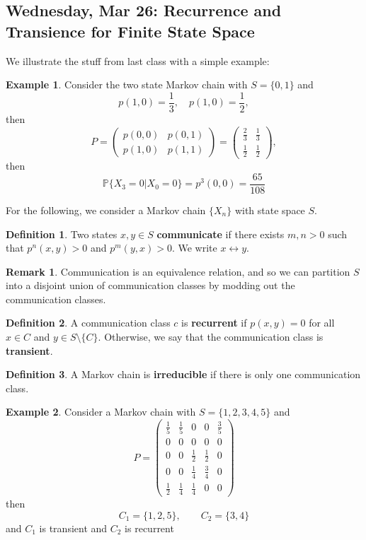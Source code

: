 \documentclass[10pt, oneside]{article}
\newcommand{\bbP}{\mathbb{P}}
\theoremstyle{definition}
\newtheorem{exmp}{Example}[section]
\newtheorem{defn}{Definition}
\newtheorem{rem}{Remark}
\begin{document}
\newpage
\subsection{Wednesday, Mar 26: Recurrence and Transience for Finite State Space}
We illustrate the stuff from last class with a simple example:
\begin{exmp}
    Consider the two state Markov chain with $S = \{0,1\}$ and 
    \[p(1,0) = \frac{1}{3}, \quad p(1,0) = \frac{1}{2},\] then 
    \[P = \begin{pmatrix}
        p(0,0) & p(0,1)\\
        p(1,0) & p(1,1) 
    \end{pmatrix} = \begin{pmatrix}
        \frac{2}{3} & \frac{1}{3}\\
        \frac{1}{2} & \frac{1}{2}
    \end{pmatrix},\] then 
    \[\bbP\{X_3 = 0 | X_0 = 0\} = p^3(0,0) = \frac{65}{108}\]
\end{exmp}
For the following, we consider a Markov chain $\{X_n\}$ with state space $S.$
\begin{defn}
    Two states $x,y \in S$ \textbf{communicate} if there exists $m,n >0$ such that $p^n(x,y) >0$ and $p^m(y,x) > 0 .$ We write $x \leftrightarrow y.$
\end{defn}
\begin{rem}
    Communication is an equivalence relation, and so we can partition $S$ into a disjoint union of communication classes by modding out the communication classes.
\end{rem}
\begin{defn}
    A communication class $c$ is \textbf{recurrent} if $p(x,y) = 0$ for all $x\in C$ and $y \in S\setminus\{C\}.$ Otherwise, we say that the communication class is \textbf{transient}.
\end{defn}

\begin{defn}
    A Markov chain is \textbf{irreducible} if there is only one communication class.
\end{defn}

\begin{exmp}
    Consider a Markov chain with $S  = \{1,2,3,4,5\}$ and 
    \[P = \begin{pmatrix}
        \frac{1}{5} & \frac{1}{5} & 0 & 0 & \frac{3}{5}\\
        0 & 0 & 0 & 0 & 0 \\
        0 & 0 & \frac{1}{2} & \frac{1}{2} & 0\\
        0 & 0 & \frac{1}{4} & \frac{3}{4} & 0\\
        \frac{1}{2} & \frac{1}{4} & \frac{1}{4} & 0 & 0
    \end{pmatrix}\] then 
    \[C_1 = \{1,2,5\}, \qquad C_2 = \{3,4\}\] and $C_1$ is transient and $C_2$ is recurrent
\end{exmp}
\end{document}
